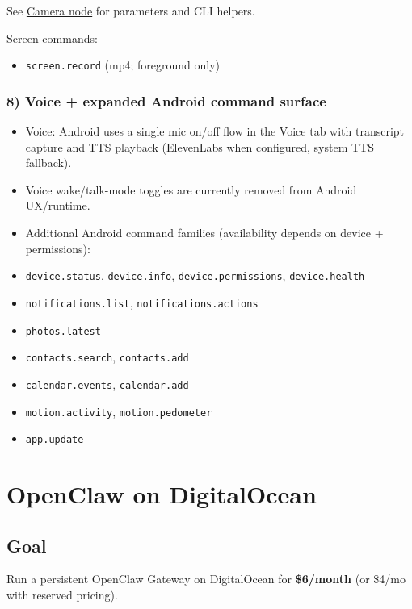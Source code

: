 See \href{/nodes/camera}{Camera node} for parameters and CLI helpers.

Screen commands:

\begin{itemize}
  \item \texttt{screen.record} (mp4; foreground only)
\end{itemize}


\subsubsection{8) Voice + expanded Android command surface}


\begin{itemize}
  \item Voice: Android uses a single mic on/off flow in the Voice tab with transcript capture and TTS playback (ElevenLabs when configured, system TTS fallback).
  \item Voice wake/talk-mode toggles are currently removed from Android UX/runtime.
  \item Additional Android command families (availability depends on device + permissions):
  \item \texttt{device.status}, \texttt{device.info}, \texttt{device.permissions}, \texttt{device.health}
  \item \texttt{notifications.list}, \texttt{notifications.actions}
  \item \texttt{photos.latest}
  \item \texttt{contacts.search}, \texttt{contacts.add}
  \item \texttt{calendar.events}, \texttt{calendar.add}
  \item \texttt{motion.activity}, \texttt{motion.pedometer}
  \item \texttt{app.update}
\end{itemize}



\clearpage

\section{OpenClaw on DigitalOcean}


\subsection{Goal}


Run a persistent OpenClaw Gateway on DigitalOcean for \textbf{\$6/month} (or \$4/mo with reserved pricing).

